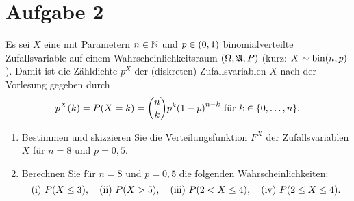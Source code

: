\documentclass{exercise}
\begin{document}
    \section*{Aufgabe 2}

    \begin{problem}
        Es sei \(X\) eine mit Parametern \(n \in \N\) und \(p \in \parentheses*{0, 1}\) binomialverteilte Zufallsvariable auf einem Wahrscheinlichkeitsraum \(\parentheses*{\Omega, \mathfrak{A}, P}\) (kurz: \(X \sim \bin\parentheses*{n, p}\)).
        Damit ist die Zähldichte \(p^X\) der (diskreten) Zufallsvariablen \(X\) nach der Vorlesung gegeben durch
        \[
            p^X\parentheses*{k} = P\parentheses*{X = k} = \binom{n}{k}p^k\parentheses*{1 - p}^{n - k}\text{ für } k \in \braces*{0, \ldots, n}.
        \]
        \begin{enumerate}
            \item Bestimmen und skizzieren Sie die Verteilungsfunktion \(F^X\) der Zufallsvariablen \(X\) für \(n = 8\) und \(p = 0,5\).
            \item Berechnen Sie für \(n = 8\) und \(p = 0,5\) die folgenden Wahrscheinlichkeiten:
            \[
                \text{(i) }P\parentheses*{X \le 3}, \quad \text{(ii) }P\parentheses*{X > 5}, \quad \text{(iii) }P\parentheses*{2 < X \le 4}, \quad \text{(iv) }P\parentheses*{2 \le X \le 4}. 
            \]
        \end{enumerate}
    \end{problem}
\end{document}
